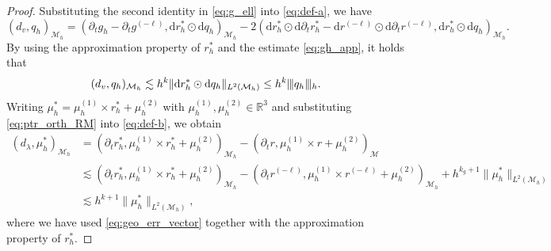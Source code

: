 \documentclass[11pt,a4paper,oneside,reqno]{amsart}
\theoremstyle{definition}
\theoremstyle{plain}
\numberwithin{theorem}{section}
\numberwithin{proposition}{section}
\numberwithin{lemma}{section}
\numberwithin{equation}{section}
\newcommand{\Man}{\mathcal{M}}
\newcommand{\normt}[1]{%
	\vert\kern-0.9pt\vert\kern-0.9pt\vert #1
	\vert\kern-0.9pt\vert\kern-0.9pt\vert}
\newcommand{\GZ}[1]{{[\color{magenta}GZ:~#1}]}
\begin{document}
\begin{proof}
Substituting the second identity in \eqref{eq:g_ell} into \eqref{eq:def-a}, we have
\[ 
    (d_v, q_h)_{\Man_h} = 
     (\partial_t g_h - \partial_t g^{(-\ell)} , \mathrm{d} r_h^* \odot \mathrm{d} q_h)_{\Man_h} -
    2(\mathrm{d} r_h^* \odot \mathrm{d} \partial_t r_h^* - \mathrm{d} r^{(-\ell)} \odot \mathrm{d} \partial_t r^{(-\ell)}, \mathrm{d} r_h^* \odot \mathrm{d} q_h)_{\Man_h}.  
\]
By using the approximation property of $r_h^*$ and the estimate \eqref{eq:gh_app}, %
it holds that
\[ (d_v, q_h)_{\Man_h} \lesssim h^k \|\mathrm{d} r_h^* \odot \mathrm{d} q_h \|_{L^2(\Man_h)}
\leq h^k \normt{q_h}_h
. \]
Writing $ \mu_h^* = \mu_h^{(1)} \times r_h^* + \mu_h^{(2)} $ with $\mu_h^{(1)}, \mu_h^{(2)} \in \mathbb{R}^3$ and  substituting \eqref{eq:ptr_orth_RM} into \eqref{eq:def-b}, we obtain
\[ \begin{aligned}
    (d_{\lambda}, \mu_h^*)_{\Man_h} &= 
    (\partial_t r_h^*, \mu_h^{(1)} \times r_h^* + \mu_h^{(2)})_{\Man_h} - 
    (\partial_t r, \mu_h^{(1)} \times r + \mu_h^{(2)})_{\Man} \\ 
     &\lesssim   (\partial_t r_h^*, \mu_h^{(1)} \times r_h^* + \mu_h^{(2)})_{\Man_h} - 
    (\partial_t r^{(-\ell)}, \mu_h^{(1)} \times r^{(-\ell)} + \mu_h^{(2)})_{\Man_h} + h^{k_g+1}\|\mu_h^*\|_{L^2(\Man_h)} \\
    &\lesssim h^{k+1}\|\mu_h^*\|_{L^2(\Man_h)}, 
\end{aligned} \]
where we have used \eqref{eq:geo_err_vector} together with the approximation property of $r_h^*$. 
\end{proof}
\end{document}
